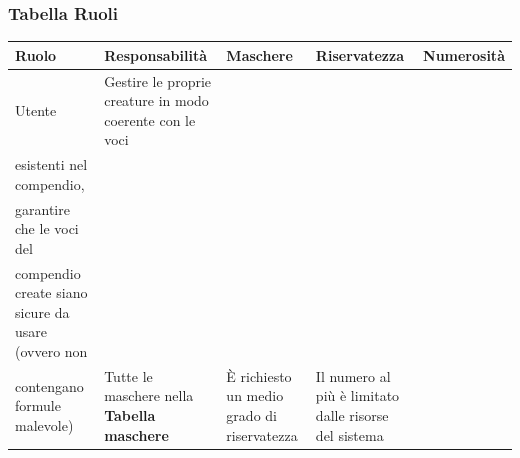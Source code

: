 \documentclass[a4paper, 11pt]{article}
\let\newline\\
\begin{document}
\subsubsection*{Tabella Ruoli}
\begin{adjustwidth}{-1cm}{-1cm}
\begin{center}
    \begin{tabular}{|p{1.5cm}|p{5cm}|p{3cm}|p{2.5cm}|p{2.5cm}|}
        \hline
        \textbf{Ruolo} & \textbf{Responsabilità} & \textbf{Maschere} & \textbf{Riservatezza} & \textbf{Numerosità} \\\hline
        Utente & Gestire le proprie creature in modo coerente con le voci \newline esistenti nel compendio, \newline garantire che le voci del \newline compendio create siano sicure da usare (ovvero non \newline contengano formule malevole) & Tutte le maschere nella \textbf{Tabella maschere} & È richiesto un medio grado di riservatezza & Il numero al più è limitato dalle risorse del sistema \\\hline
    \end{tabular}
\end{center}
\end{adjustwidth}
\end{document}
